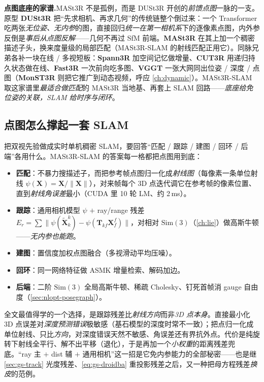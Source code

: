 \begin{note}
\textbf{点图底座的家谱.}\;MASt3R 不是孤例，而是 DUSt3R 开创的\emph{前馈点图}一脉的一支。原型 \textbf{DUSt3R} 把“先求相机、再求几何”的传统链整个倒过来：一个 Transformer 吃两张\emph{无位姿、无内参}的图，直接回归\emph{统一在第一相机系}下的逐像素点图，内外参反倒是\emph{事后从点图反解}——几何不再过 SfM 前端。\textbf{MASt3R} 在其上加一个稠密描述子头，换来度量级的局部匹配（MASt3R-SLAM 的射线匹配正用它）。同脉兄弟各补一块在线 / 多视短板：\textbf{Spann3R} 加空间记忆做增量、\textbf{CUT3R} 用递归持久状态做在线、\textbf{Fast3R} 一次前向吃多图、\textbf{VGGT} 一张大网同出位姿 / 深度 / 点图（\textbf{MonST3R} 则把它推广到动态视频，呼应 \cref{ch:dynamic}）。MASt3R-SLAM 取这家谱里\emph{最适合做匹配}的 MASt3R 当地基、再套上 SLAM 回路——\emph{底座给免位姿的关联，SLAM 给时序与闭环}。
\end{note}

\subsection{点图怎么撑起一套 SLAM}

把双视先验做成实时单机稠密 SLAM，要回答“匹配 / 跟踪 / 建图 / 回环 / 后端”各用什么。MASt3R-SLAM 的答案每一格都把点图用到底：
\begin{itemize}
  \item \textbf{匹配}：不暴力搜描述子，而把参考帧点图归一化成\emph{射线图}（每像素一条单位射线 $\psi(\mathbf X)=\mathbf X/\lVert\mathbf X\rVert$），对来帧每个 3D 点迭代调它在参考帧的像素位置、直到\emph{射线角误差}最小（CUDA 里 10 轮 LM、约 2\,ms）。
  \item \textbf{跟踪}：通用相机模型 $\psi$ $+$ ray/range 残差 $E_r=\sum\lVert\psi(\tilde{\mathbf X}_k^k)-\psi(\mathbf T_{kf}\mathbf X_f^f)\rVert$，对相对 $\mathrm{Sim}(3)$（\cref{ch:lie}）做高斯牛顿——\emph{无内参也能跑}。
  \item \textbf{建图}：置信度加权点图融合（多视滑动平均压噪）。
  \item \textbf{回环}：同一网络特征做 ASMK 增量检索、解码加边。
  \item \textbf{后端}：二阶 $\mathrm{Sim}(3)$ 全局高斯牛顿、稀疏 Cholesky、钉死首帧消 gauge 自由度（\cref{sec:nlopt-posegraph}）。
\end{itemize}

\begin{insight}
全文最值得学的一个选择，是跟踪残差比\emph{射线方向}而非\emph{3D 点本身}。直接最小化 3D 点误差对\emph{深度预测错误}极敏感（基石模型的深度时常不一致）；把点归一化成单位射线、只比\emph{方向}，对深度错误天然不敏感、角误差还有界抗外点。代价是纯旋转下射线全平行、解不出平移（退化），于是再加一个\emph{小权重}的距离残差兜底。“ray 主 $+$ dist 辅 $+$ 通用相机”这一招是它免内参能力的全部秘密——也是继 \cref{sec:gs-track} 光度残差、\cref{eq:gs-droidba} 重投影残差之后，又一种把母方程残差\emph{换皮}的范例。
\end{insight}

